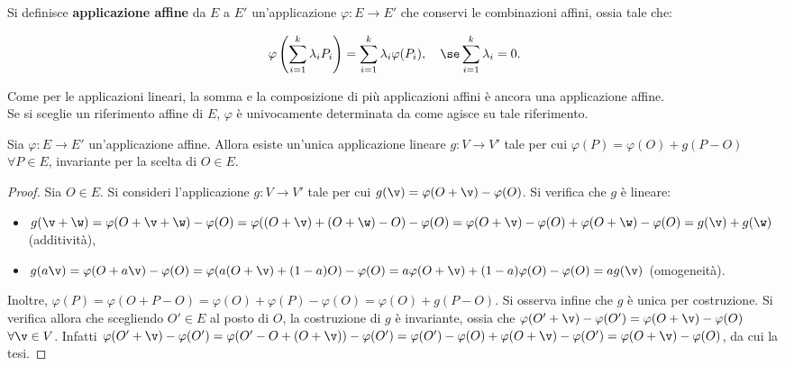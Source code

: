 \documentclass[11pt]{article}
\begin{document}
	\begin{definition}  Si definisce \textbf{applicazione affine} da $E$ a $E'$ un'applicazione $\varphi : E \to E'$
		che conservi le combinazioni affini, ossia tale che:
		
		\[ \varphi\left( \sum_{i=1}^k \lambda_i P_i \right) = \sum_{i=1}^k \lambda_i \varphi(P_i), \quad \se \sum_{i=1}^k \lambda_i = 0. \]
	\end{definition}
	
	\begin{remark}\nl
		\li Come per le applicazioni lineari, la somma e la composizione di più applicazioni affini è
		ancora una applicazione affine. \\
		\li Se si sceglie un riferimento affine di $E$, $\varphi$ è univocamente determinata
		da come agisce su tale riferimento.
	\end{remark}
	
	\begin{theorem}
		Sia $\varphi : E \to E'$ un'applicazione affine. Allora esiste un'unica applicazione lineare $g : V \to V'$
		tale per cui $\varphi(P) = \varphi(O) + g(P-O)$ $\forall P \in E$, invariante per la scelta di $O \in E$.
	\end{theorem}
	
	\begin{proof}
		Sia $O \in E$. Si consideri l'applicazione $g : V \to V'$ tale per cui $g(\v) = \varphi(O + \v) - \varphi(O)$.
		Si verifica che $g$ è lineare:
		
		\begin{itemize}
			\item $g(\v + \w) = \varphi(O + \v + \w) - \varphi(O) = \varphi((O + \v) + (O + \w) - O) - \varphi(O) =
			\varphi(O + \v) - \varphi(O) + \varphi(O + \w) - \varphi(O) = g(\v) + g(\w)$ (additività),
			\item $g(a\v) = \varphi(O + a\v) - \varphi(O) = \varphi(a(O + \v) + (1-a)O) - \varphi(O) =
			a\varphi(O + \v) + (1-a)\varphi(O) - \varphi(O) = ag(\v)$ (omogeneità).
		\end{itemize}
		
		Inoltre, $\varphi(P) = \varphi(O + P - O) = \varphi(O) + \varphi(P) - \varphi(O) = \varphi(O) + g(P-O)$. Si
		osserva infine che $g$ è unica per costruzione. Si
		verifica allora che scegliendo $O' \in E$ al posto di $O$, la costruzione di $g$ è invariante, ossia
		che $\varphi(O' + \v) - \varphi(O') = \varphi(O + \v) - \varphi(O)$ $\forall \v \in V$. Infatti
		$\varphi(O' + \v) - \varphi(O') = \varphi(O' - O + (O + \v)) - \varphi(O') =
		\varphi(O') - \varphi(O) + \varphi(O + \v) - \varphi(O') = \varphi(O + \v) - \varphi(O)$, da cui
		la tesi.
	\end{proof}
	
\end{document}
